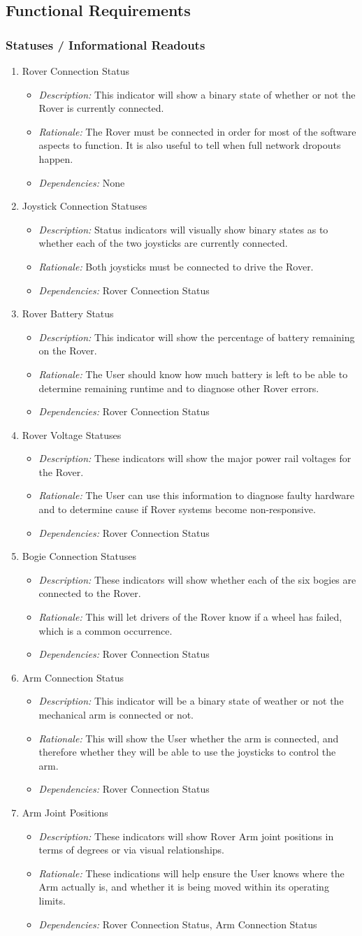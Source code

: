 \documentclass[onecolumn, draftclsnofoot, 10pt, compsoc]{IEEEtran}
\newcommand{\functRequ}[4]{
\item #1%
\par
\begin{itemize}
\item \textit{Description:} #2.%
\item \textit{Rationale:} #3.%
\item \textit{Dependencies:} #4%
\end{itemize}
}
\begin{document}
\subsection{Functional Requirements}
\subsubsection{Statuses / Informational Readouts}
\begin{enumerate}
\functRequ{Rover Connection Status}
{This indicator will show a binary state of whether or not the Rover is currently connected}
{The Rover must be connected in order for most of the software aspects to function. 
It is also useful to tell when full network dropouts happen}
{None}

\functRequ{Joystick Connection Statuses}
{Status indicators will visually show binary states as to whether each of the two joysticks are currently connected}
{Both joysticks must be connected to drive the Rover}
{Rover Connection Status}

\functRequ{Rover Battery Status}
{This indicator will show the percentage of battery remaining on the Rover}
{The User should know how much battery is left to be able to determine remaining runtime and to diagnose other Rover errors}
{Rover Connection Status}

\functRequ{Rover Voltage Statuses}
{These indicators will show the major power rail voltages for the Rover}
{The User can use this information to diagnose faulty hardware and to determine cause if Rover systems become non-responsive}
{Rover Connection Status}
  
\functRequ{Bogie Connection Statuses}
{These indicators will show whether each of the six bogies are connected to the Rover}
{This will let drivers of the Rover know if a wheel has failed, which is a common occurrence}
{Rover Connection Status}

\functRequ{Arm Connection Status}
{This indicator will be a binary state of weather or not the mechanical arm is connected or not}
{This will show the User whether the arm is connected, and therefore whether they will be able to use the joysticks to control the arm}
{Rover Connection Status}

\functRequ{Arm Joint Positions}
{These indicators will show Rover Arm joint positions in terms of degrees or via visual relationships}
{These indications will help ensure the User knows where the Arm actually is, and whether it is being moved within its operating limits}
{Rover Connection Status, Arm Connection Status}


\end{enumerate}
\end{document}
